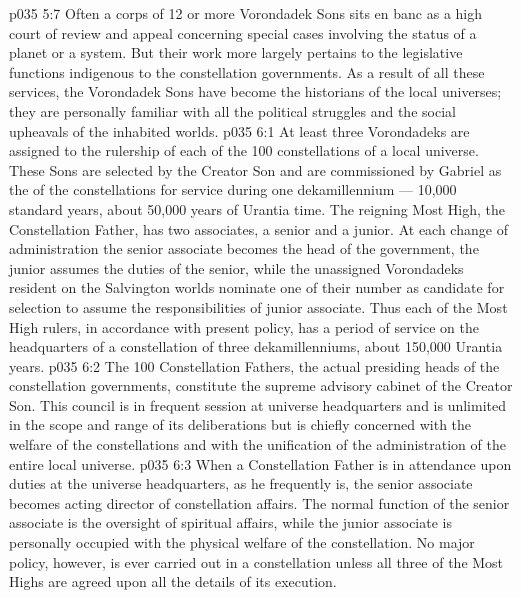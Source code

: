 \vs p035 5:7 Often a corps of 12 or more Vorondadek Sons sits en banc as a high court of review and appeal concerning special cases involving the status of a planet or a system. But their work more largely pertains to the legislative functions indigenous to the constellation governments. As a result of all these services, the Vorondadek Sons have become the historians of the local universes; they are personally familiar with all the political struggles and the social upheavals of the inhabited worlds.
\vs p035 6:1 At least three Vorondadeks are assigned to the rulership of each of the 100 constellations of a local universe. These Sons are selected by the Creator Son and are commissioned by Gabriel as the  of the constellations for service during one dekamillennium --- 10,000 standard years, about 50,000 years of Urantia time. The reigning Most High, the Constellation Father, has two associates, a senior and a junior. At each change of administration the senior associate becomes the head of the government, the junior assumes the duties of the senior, while the unassigned Vorondadeks resident on the Salvington worlds nominate one of their number as candidate for selection to assume the responsibilities of junior associate. Thus each of the Most High rulers, in accordance with present policy, has a period of service on the headquarters of a constellation of three dekamillenniums, about 150,000 Urantia years.
\vs p035 6:2 The 100 Constellation Fathers, the actual presiding heads of the constellation governments, constitute the supreme advisory cabinet of the Creator Son. This council is in frequent session at universe headquarters and is unlimited in the scope and range of its deliberations but is chiefly concerned with the welfare of the constellations and with the unification of the administration of the entire local universe.
\vs p035 6:3 When a Constellation Father is in attendance upon duties at the universe headquarters, as he frequently is, the senior associate becomes acting director of constellation affairs. The normal function of the senior associate is the oversight of spiritual affairs, while the junior associate is personally occupied with the physical welfare of the constellation. No major policy, however, is ever carried out in a constellation unless all three of the Most Highs are agreed upon all the details of its execution.
